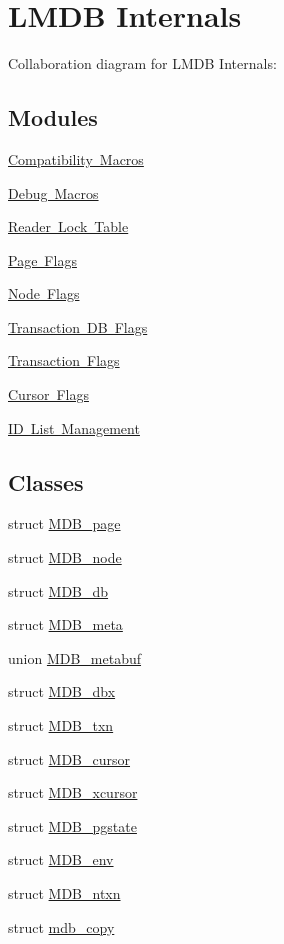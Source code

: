 \hypertarget{group__internal}{}\section{L\+M\+DB Internals}
\label{group__internal}
Collaboration diagram for L\+M\+DB Internals\+:
\subsection*{Modules}
\begin{DoxyCompactItemize}
\item 
\mbox{\hyperlink{group__compat}{Compatibility Macros}}
\item 
\mbox{\hyperlink{group__debug}{Debug Macros}}
\item 
\mbox{\hyperlink{group__readers}{Reader Lock Table}}
\item 
\mbox{\hyperlink{group__mdb__page}{Page Flags}}
\item 
\mbox{\hyperlink{group__mdb__node}{Node Flags}}
\item 
\mbox{\hyperlink{group__mt__dbflag}{Transaction D\+B Flags}}
\item 
\mbox{\hyperlink{group__mdb__txn}{Transaction Flags}}
\item 
\mbox{\hyperlink{group__mdb__cursor}{Cursor Flags}}
\item 
\mbox{\hyperlink{group__idls}{I\+D List Management}}
\end{DoxyCompactItemize}
\subsection*{Classes}
\begin{DoxyCompactItemize}
\item 
struct \mbox{\hyperlink{struct_m_d_b__page}{M\+D\+B\+\_\+page}}
\item 
struct \mbox{\hyperlink{struct_m_d_b__node}{M\+D\+B\+\_\+node}}
\item 
struct \mbox{\hyperlink{struct_m_d_b__db}{M\+D\+B\+\_\+db}}
\item 
struct \mbox{\hyperlink{struct_m_d_b__meta}{M\+D\+B\+\_\+meta}}
\item 
union \mbox{\hyperlink{union_m_d_b__metabuf}{M\+D\+B\+\_\+metabuf}}
\item 
struct \mbox{\hyperlink{struct_m_d_b__dbx}{M\+D\+B\+\_\+dbx}}
\item 
struct \mbox{\hyperlink{struct_m_d_b__txn}{M\+D\+B\+\_\+txn}}
\item 
struct \mbox{\hyperlink{struct_m_d_b__cursor}{M\+D\+B\+\_\+cursor}}
\item 
struct \mbox{\hyperlink{struct_m_d_b__xcursor}{M\+D\+B\+\_\+xcursor}}
\item 
struct \mbox{\hyperlink{struct_m_d_b__pgstate}{M\+D\+B\+\_\+pgstate}}
\item 
struct \mbox{\hyperlink{struct_m_d_b__env}{M\+D\+B\+\_\+env}}
\item 
struct \mbox{\hyperlink{struct_m_d_b__ntxn}{M\+D\+B\+\_\+ntxn}}
\item 
struct \mbox{\hyperlink{structmdb__copy}{mdb\+\_\+copy}}
\end{DoxyCompactItemize}
